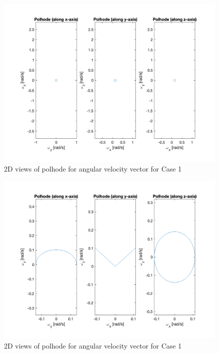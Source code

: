 \begin{figure}[H]
\centering
\includegraphics[scale=0.6]{Images/ps2_problem9_p8_x.png}
\caption{2D views of polhode for angular velocity vector for Case 1}
\label{fig:ps2_problem9_p8_x}
\end{figure}

\begin{figure}[H]
\centering
\includegraphics[scale=0.6]{Images/ps2_problem9_p8_y.png}
\caption{2D views of polhode for angular velocity vector for Case 1}
\label{fig:ps2_problem9_p8_y}
\end{figure}

